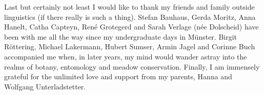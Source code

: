 \begin{refsection}
Last but certainly not least I would like to thank my friends and family outside linguistics (if there really is such a thing). Stefan Bauhaus, Gerda Moritz, Anna Hanelt, Catha Capteyn, René Grotegerd and Sarah Verlage (née Dolscheid) have been with me all the way since my undergraduate days in Münster. Birgit Röttering, Michael Lakermann, Hubert Sumser, Armin Jagel and Corinne Buch accompanied me when, in later years, my mind would wander astray into the realms of botany, entomology and meadow conservation. Finally, I am immensely grateful for the unlimited love and support from my parents, Hanna and Wolfgang Unterladstetter.

\printbibliography[heading=subbibliography]
\end{refsection}